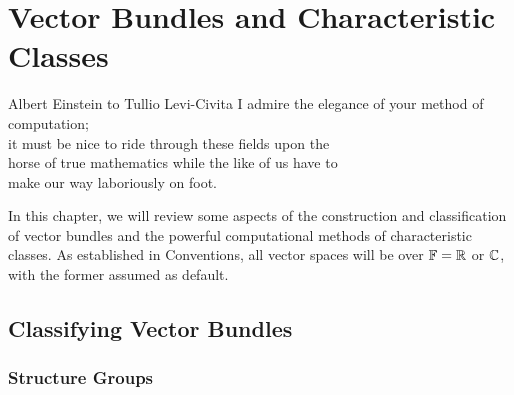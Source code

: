 \chapter{Vector Bundles and Characteristic Classes}\label{chap:vector-bundles}

\begin{epigraph}{24em}{Albert Einstein {\normalfont to} Tullio Levi-Civita}
	I admire the elegance of your method of computation;\\
	it must be nice to ride through these fields upon the\\
	horse of true mathematics while the like of us have to\\
	make our way laboriously on foot.\\
\end{epigraph}

In this chapter, we will review some aspects of the construction and classification of vector bundles and the powerful computational methods of characteristic classes. As established in Conventions, all vector spaces will be over $\mathbb{F}=\mathbb{R}$ or $\mathbb{C}$, with the former assumed as default.

\section{Classifying Vector Bundles}

\subsection{Structure Groups}\label{sec:structure-groups}

